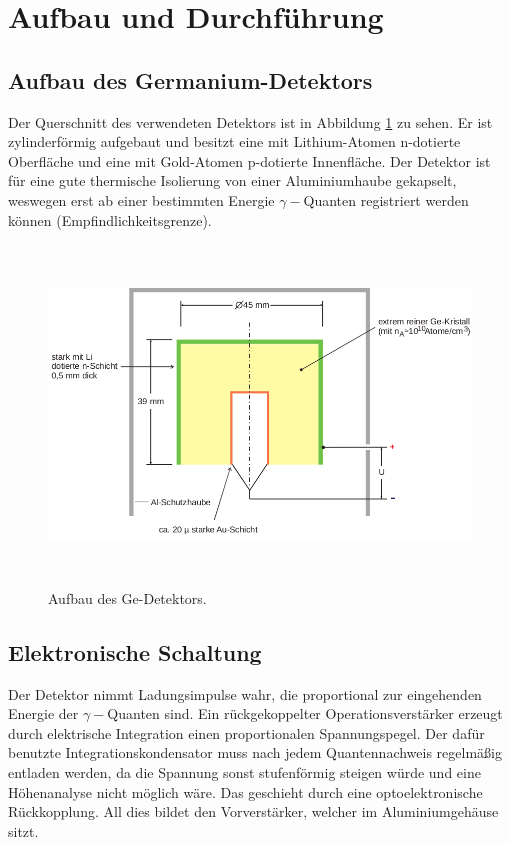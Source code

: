 \newpage
\section{Aufbau und Durchführung}
\label{sec:Durchfuehrung}
\subsection{Aufbau des Germanium-Detektors}
Der Querschnitt des verwendeten Detektors ist in Abbildung \ref{fig:Detektor} zu sehen.
Er ist zylinderförmig aufgebaut und besitzt eine mit Lithium-Atomen n-dotierte Oberfläche und eine mit Gold-Atomen p-dotierte Innenfläche.
Der Detektor ist für eine gute thermische Isolierung von einer Aluminiumhaube gekapselt, weswegen erst ab einer bestimmten Energie $\gamma-$Quanten registriert werden können (Empfindlichkeitsgrenze).
 \begin{figure}
   \centering
   \includegraphics[height=9cm]{content/Detektor.png}
   \caption{Aufbau des Ge-Detektors.\cite{V18}}
   \label{fig:Detektor}
 \end{figure}
\subsection{Elektronische Schaltung}
Der Detektor nimmt Ladungsimpulse wahr, die proportional zur eingehenden Energie der $\gamma-$Quanten sind.
Ein rückgekoppelter Operationsverstärker erzeugt durch elektrische Integration einen proportionalen Spannungspegel.
Der dafür benutzte Integrationskondensator muss nach jedem Quantennachweis regelmäßig entladen werden, da die Spannung sonst stufenförmig steigen würde und eine Höhenanalyse nicht möglich wäre.
Das geschieht durch eine optoelektronische Rückkopplung.
All dies bildet den Vorverstärker, welcher im Aluminiumgehäuse sitzt.

